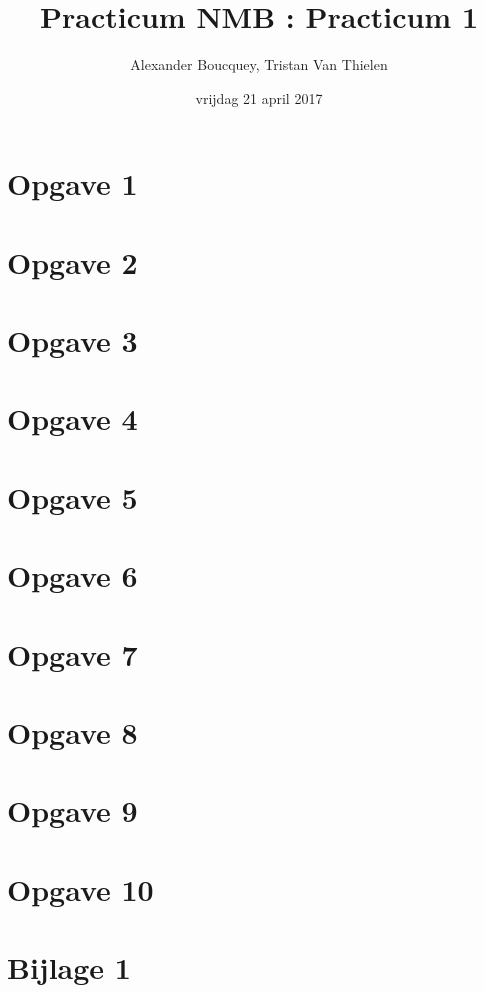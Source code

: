 \documentclass[a4paper]{article}
\title{Practicum NMB : Practicum 1}
\author{Alexander Boucquey, Tristan Van Thielen}
\date{vrijdag 21 april 2017}
\newcommand{\opgave}[1]{\section*{Opgave #1}}
\begin{document}
\maketitle

\opgave{1}


\opgave{2}


\begin{flushleft}


\opgave{3}


\opgave{4}


\opgave{5}


\opgave{6}


\opgave{7}


\opgave{8}


\opgave{9}


\opgave{10}


\section*{Bijlage 1}


\end{flushleft}
\end{document}
